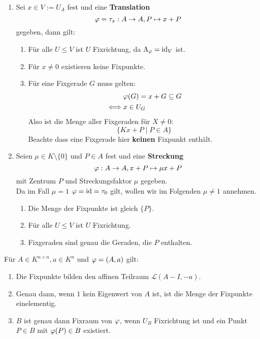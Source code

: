 \documentclass[parskip,a4paper,twoside,DIV15,BCOR12mm]{scrbook}
\begin{document}
\begin{example}
\begin{enumerate}
\item Sei $x\in V:=U_A$ fest und eine \textbf{Translation} 
\[\varphi=\tau_x:A\to A,P\mapsto x+P\] 
gegeben, dann gilt:
\begin{enumerate}
\item Für alle $U\le V$ ist $U$ Fixrichtung, da $\Lambda_\varphi=\operatorname{id}_V$ ist.
\item Für $x\ne 0$ existieren keine Fixpunkte.
\item Für eine Fixgerade $G$ muss gelten:
\begin{align*}
&\varphi(G)=x+G\subseteq G\\
\iff &x\in U_G
\end{align*}
Also ist die Menge aller Fixgeraden für $X\ne 0$:
\[\{Kx+P\mid P\in A\}\]
Beachte dass eine Fixgerade hier \textbf{keinen} Fixpunkt enthält.
\end{enumerate}
\item Seien $\mu\in K\setminus\{0\}$ und $P\in A$ fest und eine \textbf{Streckung}
\[\varphi:A\to A,x+P\mapsto \mu x+P\]
mit Zentrum $P$ und Streckungsfaktor $\mu$ gegeben.\\
Da im Fall $\mu=1$ $\varphi=\operatorname{id}=\tau_0$ gilt, wollen wir im Folgenden $\mu\ne 1$ annehmen.
\begin{enumerate}
\item Die Menge der Fixpunkte ist gleich $\{P\}$.
\item Für alle $U\le V$ ist $U$ Fixrichtung.
\item Fixgeraden sind genau die Geraden, die $P$ enthalten.
\end{enumerate}
\end{enumerate}
\end{example}

\begin{lemma}
Für $A\in K^{n\times n},a\in K^n$ und $\varphi=(A,a)$ gilt:
\begin{enumerate}
\item Die Fixpunkte bilden den affinen Teilraum $\mathcal{L}(A-I,-a)$.
\item Genau dann, wenn $1$ kein Eigenwert von $A$ ist, ist die Menge der Fixpunkte
einelementig.
\item $B$ ist genau dann Fixraum von $\varphi$, wenn $U_B$ Fixrichtung ist und ein
Punkt $P\in B$ mit $\varphi(P)\in B$ existiert.
\end{enumerate}
\end{lemma}
\end{document}
